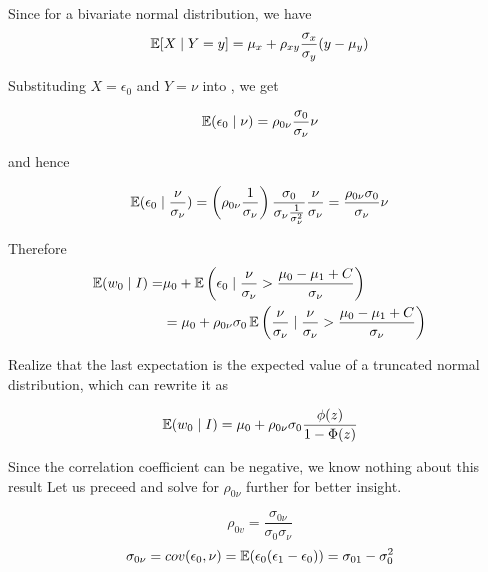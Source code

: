 Since for a bivariate normal distribution, we have 
\begin{equation}
    \label{eq:biv-exp}
    \operatorname{\mathbb{E}}[X \mid Y=y] = \mu_x + \rho_{xy}\frac{\sigma_x}{\sigma_y}(y - \mu_y) 
\end{equation}

Substituding $X=\epsilon_0$ and $Y=\nu$ into , we get

\begin{equation}
    \label{eq:biv_normal_exp_0}
    \operatorname{\mathbb{E}}(\epsilon_0 \mid \nu)=\rho_{0\nu}\frac{\sigma_0}{\sigma_\nu}\nu
\end{equation}

and hence

\begin{equation*}
    \operatorname{\mathbb{E}}(\epsilon_0 \mid \frac{\nu}{\sigma_\nu})=
    \left(\rho_{0\nu} \frac{1}{\sigma_\nu}\right)
    \frac{\sigma_0}{\sigma_\nu \frac{1}{\sigma_\nu^2}}
    \frac{\nu}{\sigma_\nu}=\frac{\rho_{0\nu}\sigma_0 }{\sigma_\nu}\nu
\end{equation*}

Therefore
\begin{align}
    \operatorname{\mathbb{E}}(w_{0} \mid I) =& 
     \mu_0 + \operatorname{\mathbb{E}} \left(
            \epsilon_0 \mid \frac{\nu}{\sigma_\nu} > \frac{\mu_0 - \mu_1 + C}{\sigma_\nu}
            \right) \nonumber \\
    &= \mu_0 + \rho_{0\nu}\sigma_0 \operatorname{\mathbb{E}} \left(
        \frac{\nu}{\sigma_\nu} 
        \mid
        \frac{\nu}{\sigma_\nu} > \frac{\mu_0 - \mu_1 + C}{\sigma_\nu}
    \right) \label{eq:before_trunc}
\end{align}

Realize that the last expectation 
is the expected value of a truncated normal distribution, 
which can rewrite it as 

\begin{equation}
    \label{eq:exp_wo_1}
    \operatorname{\mathbb{E}}(w_{0} \mid I) = 
    \mu_0 + \rho_{0\nu}\sigma_0 \frac{\phi(z)}{1-\Phi(z)}
\end{equation}

Since the correlation coefficient can be negative,
 we know nothing about this result
Let us preceed and solve for $\rho_{0\nu}$ 
further for better insight. 


\begin{equation*}
    \rho_{0v} = \frac{\sigma_{0\nu}}{\sigma_0\sigma_\nu}
\end{equation*}
\begin{equation}
    \label{eq:cov_0_nu}
    \sigma_{0\nu}=cov(\epsilon_0, \nu)=\operatorname{\mathbb{E}}(\epsilon_0 (\epsilon_1 - \epsilon_0)) = \sigma_{01}-\sigma_0^2
\end{equation}

